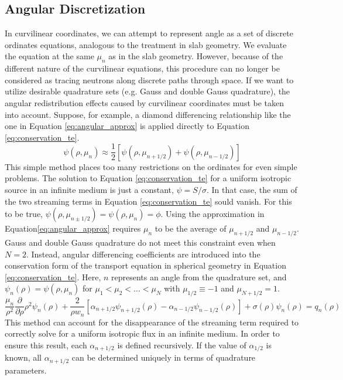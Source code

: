\documentclass[11pt, oneside]{article}   	%
\begin{document}
\subsection{Angular Discretization}

In curvilinear coordinates, we can attempt to represent angle as a set of discrete ordinates equations, analogous to the treatment in slab geometry. We evaluate the equation at the same $\mu_n$ as in the slab geometry. However, because of the different nature of the curvilinear equations, this procedure can no longer be considered as tracing neutrons along discrete paths through space. If we want to utilize desirable quadrature sets (e.g. Gauss and double Gauss quadrature), the angular redistribution effects caused by curvilinear coordinates must be taken into account. Suppose, for example, a diamond differencing relationship like the one in Equation \ref{eq:angular_approx} is applied directly to Equation \ref{eq:conservation_te}.
%
\begin{equation}\label{eq:angular_approx}
\psi(\rho, \mu_n) \approx \frac{1}{2}\left[\psi(\rho, \mu_{n+1/2})+\psi(\rho, \mu_{n-1/2})\right]
\end{equation}
%
This simple method places too many restrictions on the ordinates for even simple problems. The solution to Equation \ref{eq:conservation_te} for a uniform isotropic source in an infinite medium is just a constant, $\psi = S/\sigma$. In that case, the sum of the two streaming terms in Equation \ref{eq:conservation_te} sould vanish. For this to be true, $\psi(\rho, \mu_{n\pm1/2})=\psi(\rho, \mu_n)=\phi$. Using the approximation in Equation\ref{eq:angular_approx} requires $\mu_n$ to be the average of $\mu_{n+1/2}$ and $\mu_{n-1/2}$. Gauss and double Gauss quadrature do not meet this constraint even when $N=2$. Instead, angular differencing coefficients are introduced into the conservation form of the transport equation in spherical geometry in Equation \ref{eq:conservation_te}. Here, $n$ represents an angle from the quadrature set, and $\psi_n(\rho) = \psi(\rho, \mu_n)$ for $\mu_1 < \mu_2 < \dots < \mu_N$ with $\mu_{1/2} \equiv -1$ and $\mu_{N+1/2} = 1$.
%
\begin{equation}\label{eq:conservation_te_angular_difference}
\frac{\mu_n}{\rho^2}\frac{\partial}{\partial\rho}\rho^2\psi_n(\rho)+
\frac{2}{\rho w_n}\left[\alpha_{n+1/2}\psi_{n+1/2}(\rho)-\alpha_{n-1/2}\psi_{n-1/2}(\rho)\right]+
\sigma(\rho)\psi_n(\rho) = 
q_n(\rho)
\end{equation}
%
This method can account for the disappearance of the streaming term required to correctly solve for a uniform isotropic flux in an infinite medium. In order to ensure this result, each $\alpha_{n+1/2}$ is defined recursively. If the value of $\alpha_{1/2}$ is known, all  $\alpha_{n+1/2}$ can be determined uniquely in terms of quadrature parameters.
\end{document}
